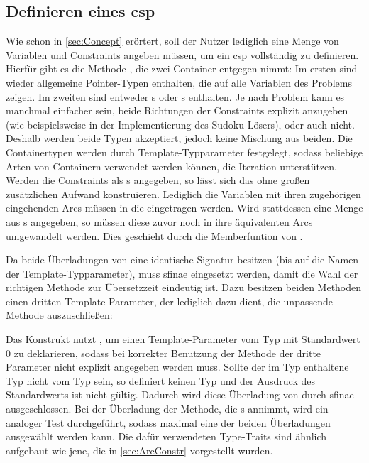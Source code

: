 \subsection{Definieren eines \ac*{csp}}
Wie schon in \cref{sec:Concept} erörtert, soll der Nutzer lediglich eine Menge von Variablen und Constraints angeben müssen, um ein \ac*{csp} vollständig zu definieren. Hierfür
gibt es die Methode , die zwei Container entgegen nimmt: Im ersten sind wieder allgemeine Pointer-Typen enthalten, die auf alle Variablen des Problems zeigen.
Im zweiten sind entweder s oder s enthalten. Je nach Problem kann es manchmal einfacher sein, beide Richtungen der Constraints explizit
anzugeben (wie beispielsweise in der Implementierung des Sudoku-Lösers), oder auch nicht. Deshalb werden beide Typen akzeptiert, jedoch keine Mischung aus beiden. Die Containertypen
werden durch Template-Typparameter festgelegt, sodass beliebige Arten von Containern verwendet werden können, die Iteration unterstützen. Werden die Constraints als
s angegeben, so lässt sich das  ohne großen zusätzlichen Aufwand konstruieren. Lediglich die Variablen mit ihren zugehörigen eingehenden Arcs
müssen in die  eingetragen werden. Wird stattdessen eine Menge aus s angegeben, so müssen diese zuvor noch in ihre äquivalenten
Arcs umgewandelt werden. Dies geschieht durch die Memberfuntion  von .

Da beide Überladungen von  eine identische Signatur besitzen (bis auf die Namen der Template-Typparameter), muss \ac*{sfinae} eingesetzt werden, damit
die Wahl der richtigen Methode zur Übersetzzeit eindeutig ist. Dazu besitzen beiden Methoden einen dritten Template-Parameter, der lediglich dazu dient, die unpassende Methode
auszuschließen:

Das Konstrukt nutzt , um einen Template-Parameter vom Typ  mit Standardwert 0 zu deklarieren, sodass bei korrekter Benutzung der Methode
der dritte Parameter nicht explizit angegeben werden muss. Sollte der im Typ  enthaltene Typ nicht vom Typ  sein, so definiert
 keinen Typ und der Ausdruck des Standardwerts ist nicht gültig. Dadurch wird diese Überladung von  durch \ac*{sfinae}
ausgeschlossen. Bei der Überladung der Methode, die s annimmt, wird ein analoger Test durchgeführt, sodass maximal eine der beiden Überladungen ausgewählt
werden kann. Die dafür verwendeten Type-Traits sind ähnlich aufgebaut wie jene, die in \cref{sec:ArcConstr} vorgestellt wurden.

